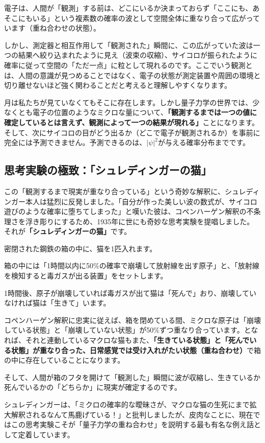 電子は、人間が「観測」する前は、どこにいるか決まっておらず「ここにも、あそこにもいる」という複素数の確率の波として空間全体に重なり合って広がっています（重ね合わせの状態）。

しかし、測定器と相互作用して「観測された」瞬間に、この広がっていた波は一つの結果へ絞り込まれたように見え（波束の収縮）、サイコロが振られたように確率に従って空間の「ただ一点」に粒として現れるのです。ここでいう観測とは、人間の意識が見つめることではなく、電子の状態が測定装置や周囲の環境と切り離せないほど強く関わることだと考えると理解しやすくなります。

月は私たちが見ていなくてもそこに存在します。しかし量子力学の世界では、少なくとも電子の位置のようなミクロな量について、\textbf{「観測するまでは一つの値に確定しているとは言えず、観測によって一つの結果が現れる」}ことになります。そして、次にサイコロの目がどう出るか（どこで電子が観測されるか）を事前に完全には予測できません。予測できるのは、\(|\psi|^2\)が与える確率分布までです。

\subsection{思考実験の極致：「シュレディンガーの猫」}

この「観測するまで現実が重なり合っている」という奇妙な解釈に、シュレディンガー本人は猛烈に反発しました。「自分が作った美しい波の数式が、サイコロ遊びのような確率に堕ちてしまった」と嘆いた彼は、コペンハーゲン解釈の不条理さを浮き彫りにするため、1935年に世にも奇妙な思考実験を提唱しました。それが\textbf{「シュレディンガーの猫」}です。

密閉された鋼鉄の箱の中に、猫を1匹入れます。

箱の中には「1時間以内に50\%の確率で崩壊して放射線を出す原子」と、「放射線を検知すると毒ガスが出る装置」をセットします。

1時間後、原子が崩壊していれば毒ガスが出て猫は「死んで」おり、崩壊していなければ猫は「生きて」います。

コペンハーゲン解釈に忠実に従えば、箱を閉めている間、ミクロな原子は「崩壊している状態」と「崩壊していない状態」が50\%ずつ重なり合っています。となれば、それと連動しているマクロな猫もまた、\textbf{「生きている状態」と「死んでいる状態」が重なり合った、日常感覚では受け入れがたい状態（重ね合わせ）}で箱の中に存在していることになります。

そして、人間が箱のフタを開けて「観測した」瞬間に波が収縮し、生きているか死んでいるかの「どちらか」に現実が確定するのです。

シュレディンガーは、「ミクロの確率的な曖昧さが、マクロな猫の生死にまで拡大解釈されるなんて馬鹿げている！」と批判しましたが、皮肉なことに、現在ではこの思考実験こそが「量子力学の重ね合わせ」を説明する最も有名な例え話として定着しています。

